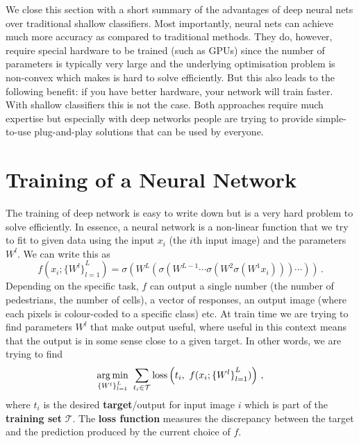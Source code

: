We close this section with a short summary of the advantages of deep neural nets
over traditional shallow classifiers. Most importantly, neural nets can achieve
much more accuracy as compared to traditional methods. They do, however, require
special hardware to be trained (such as GPUs) since the number of parameters is
typically very large and the underlying optimisation problem is non-convex which
makes is hard to solve efficiently. But this also leads to the following
benefit: if you have better hardware, your network will train faster. With
shallow classifiers this is not the case. Both approaches require much expertise
but especially with deep networks people are trying to provide simple-to-use
plug-and-play solutions that can be used by everyone.

\section{Training of a Neural Network}
The training of deep network is easy to write down but is a very hard problem to
solve efficiently. In essence, a neural network is a non-linear function that we
try to fit to given data using the input $x_i$ (the $i$th input image) and the
parameters $W^l$. We can write this as
\begin{equation*}
  f(x_i; {\{W^l\}}_{l=1}^L) = \sigma(W^L(\sigma(W^{L-1}\dotsm \sigma(W^2\sigma(W^1 x_i))) \dotsm ))\,.
\end{equation*}
Depending on the specific task, $f$ can output a single number (\eg the number
of pedestrians, the number of cells), a vector of responses, an output image
(\eg where each pixels is colour-coded to a specific class) etc. At train time
we are trying to find parameters $W^l$ that make output useful, where useful in
this context means that the output is in some sense close to a given target. In
other words, we are trying to find
\begin{equation*}
  \argmin_{{\{W^l\}}_{l=1}^L}\ \sum_{t_i \in \mathcal{T}} \loss\left(t_i,\ f(x_i; {\{W^l\}}_{l=1}^L)\right)\,,
\end{equation*}
where $t_i$ is the desired \textbf{target}/output for input image $i$ which is
part of the \textbf{training set} $\mathcal{T}$. The \textbf{loss function}
measures the discrepancy between the target and the prediction produced by the
current choice of $f$.

